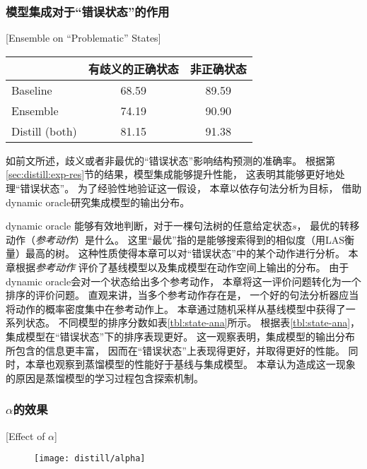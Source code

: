 \subsubsection{模型集成对于``错误状态''的作用}[Ensemble on ``Problematic'' States]\label{sec:distill:ens-on-states}
\begin{table}[t]
	\vspace{0.5em}\centering\wuhao
	\begin{tabular}{l  c c}
		\toprule[1.5pt]
		& 有歧义的正确状态 & 非正确状态 \\
		\midrule[1pt]
		Baseline & 68.59 & 89.59\\
		Ensemble & 74.19 & 90.90 \\
		Distill (both) & 81.15 & 91.38 \\
		\bottomrule[1.5pt]
	\end{tabular}
\end{table}
如前文所述，歧义或者非最优的``错误状态''影响结构预测的准确率。
根据第\ref{sec:distill:exp-res}节的结果，模型集成能够提升性能，
这表明其能够更好地处理``错误状态''。
为了经验性地验证这一假设，
本章以依存句法分析为目标，
借助dynamic oracle研究集成模型的输出分布。

dynamic oracle\cite{goldberg-nivre:2012:PAPERS,TACL302} 
能够有效地判断，对于一棵句法树的任意给定状态$s$，
最优的转移动作（\textit{参考动作}）是什么。
这里``最优''指的是能够搜索得到的相似度（用LAS衡量）最高的树。
这种性质使得本章可以对``错误状态''中的某个动作进行分析。
本章根据\textit{参考动作}
评价了基线模型以及集成模型在动作空间上输出的分布。
由于dynamic oracle会对一个状态给出多个参考动作，
本章将这一评价问题转化为一个排序的评价问题。
直观来讲，当多个参考动作存在是，
一个好的句法分析器应当将动作的概率密度集中在参考动作上。
本章通过随机采样从基线模型中获得了一系列状态。
不同模型的排序分数如表\ref{tbl:state-ana}所示。
根据表\ref{tbl:state-ana}，
集成模型在``错误状态''下的排序表现更好。
这一观察表明，集成模型的输出分布所包含的信息更丰富，
因而在``错误状态''上表现得更好，并取得更好的性能。
同时，本章也观察到蒸馏模型的性能好于基线与集成模型。
本章认为造成这一现象的原因是蒸馏模型的学习过程包含探索机制。

\subsubsection{$\alpha$的效果}[Effect of $\alpha$]
\begin{figure}[t]
	\centering
	\texttt{[image: distill/alpha]}
\end{figure}


